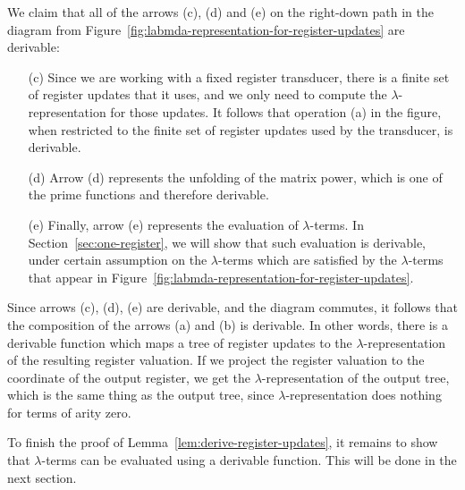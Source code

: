 We claim that all of the arrows (c), (d) and (e) on the  right-down path  in the diagram from Figure~\ref{fig:labmda-representation-for-register-updates}   are derivable:
\begin{itemize}
    \item[(c)] Since we are working with a fixed register transducer, there is a finite set of register updates that it uses, and we only need to compute the $\lambda$-representation for those updates. It follows that operation (a) in the figure, when restricted to the finite set of register updates used by the transducer, is derivable.
    \item[(d)] Arrow (d) represents the unfolding of the matrix power, which is one of the prime functions and therefore derivable. 
    \item[(e)] Finally, arrow (e) represents the evaluation of $\lambda$-terms. In Section~\ref{sec:one-register}, we will  show that such evaluation is derivable, under certain assumption on the $\lambda$-terms which are satisfied by the $\lambda$-terms that appear in Figure~\ref{fig:labmda-representation-for-register-updates}.
\end{itemize}
Since arrows (c), (d), (e) are derivable, and the diagram commutes, it follows that  the composition of the arrows (a) and (b) is derivable. In other words, there is a derivable function which maps a tree of register updates to the $\lambda$-representation of the resulting register valuation. If we project the register valuation to the coordinate of the output register, we get the $\lambda$-representation of the output tree, which is the same thing as the output tree, since $\lambda$-representation does nothing for terms of arity zero. 

To finish the proof of Lemma~\ref{lem:derive-register-updates}, it remains to show that $\lambda$-terms can be evaluated using a derivable function.  This will be done in the next section. 





